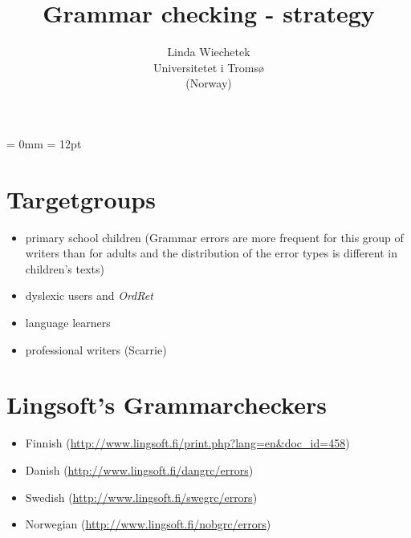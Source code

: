 \documentclass[a4paper,english,12pt]{article}
\begin{document}
\setcounter{secnumdepth}{3}
\setcounter{tocdepth}{3}
\begin{spacing}{1.0}


\newcommand{\tx}{\mbox{t\hspace{-.35em}-}} %
\newcommand{\txx}{\mbox{T\hspace{-.5em}-}} 




\title{{\Large Grammar checking - strategy}}


\author{Linda Wiechetek \\
		Universitetet i Tromsø \\
			(Norway)}
\date{}
\maketitle

\thispagestyle{empty}
\tableofcontents 
\thispagestyle{empty} %

\newpage

\setcounter{page}{1} %

\parindent = 0mm
\parskip = 12pt

\section{Targetgroups}

\begin{itemize}
\item primary school children (Grammar errors are more frequent for this group of writers than for adults and the distribution of the error types is different in children’s texts) \cite{Sofkova2003}
\item dyslexic users \cite{Pedler2007} and \textit{OrdRet}
\item language learners
\item professional writers (Scarrie)
\end{itemize}


\section{Lingsoft's Grammarcheckers}

\begin{itemize}
\item Finnish (\url{http://www.lingsoft.fi/print.php?lang=en&doc_id=458})
\item Danish (\url{http://www.lingsoft.fi/dangrc/errors})
\item Swedish (\url{http://www.lingsoft.fi/swegrc/errors})
\item Norwegian (\url{http://www.lingsoft.fi/nobgrc/errors})
\end{itemize}


\end{spacing}
\end{document}
